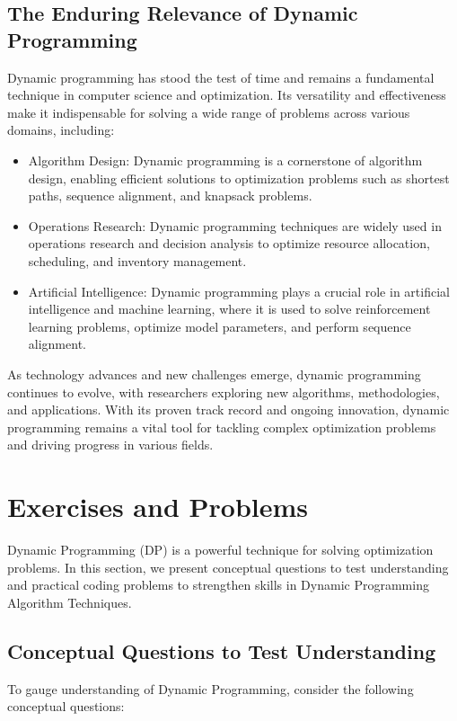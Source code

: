 \documentclass[12pt]{book} %
\begin{document}
\subsection{The Enduring Relevance of Dynamic Programming}

Dynamic programming has stood the test of time and remains a fundamental technique in computer science and optimization. Its versatility and effectiveness make it indispensable for solving a wide range of problems across various domains, including:
\begin{itemize}
    \item Algorithm Design: Dynamic programming is a cornerstone of algorithm design, enabling efficient solutions to optimization problems such as shortest paths, sequence alignment, and knapsack problems.
\item Operations Research: Dynamic programming techniques are widely used in operations research and decision analysis to optimize resource allocation, scheduling, and inventory management.
\item Artificial Intelligence: Dynamic programming plays a crucial role in artificial intelligence and machine learning, where it is used to solve reinforcement learning problems, optimize model parameters, and perform sequence alignment.
\end{itemize}

As technology advances and new challenges emerge, dynamic programming continues to evolve, with researchers exploring new algorithms, methodologies, and applications. With its proven track record and ongoing innovation, dynamic programming remains a vital tool for tackling complex optimization problems and driving progress in various fields.


\section{Exercises and Problems}
Dynamic Programming (DP) is a powerful technique for solving optimization problems. In this section, we present conceptual questions to test understanding and practical coding problems to strengthen skills in Dynamic Programming Algorithm Techniques.

\subsection{Conceptual Questions to Test Understanding}
To gauge understanding of Dynamic Programming, consider the following conceptual questions:
\end{document}
